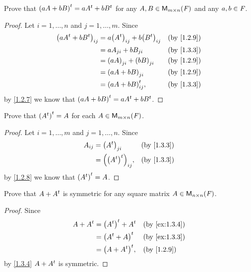 \exercisesection

\setcounter{ex}{2}
\begin{ex}\label{ex:1.3.3}
  Prove that \({\left\lparen aA + bB\right\rparen}^{t} = a{A}^{t} + b{B}^{t}\) for any \(A, B \in \mathsf{M}_{{m} \times n}({\mathit{F}})\) and any \(a, b \in \mathit{F}\).
\end{ex}

\begin{proof}
  Let \(i = 1, \dots, n\) and \(j = 1, \dots, m\).
  Since
  \begin{align*}
    \p{a\tp{A} + b\tp{B}}_{i j} & = a\p{\tp{A}}_{i j} + b\p{\tp{B}}_{i j} &  & \text{(by \cref{1.2.9})} \\
                                & = aA_{j i} + bB_{j i}                   &  & \text{(by \cref{1.3.3})} \\
                                & = \p{aA}_{j i} + \p{bB}_{j i}           &  & \text{(by \cref{1.2.9})} \\
                                & = \p{aA + bB}_{j i}                     &  & \text{(by \cref{1.2.9})} \\
                                & = \tp{\p{aA + bB}}_{i j},               &  & \text{(by \cref{1.3.3})}
  \end{align*}
  by \cref{1.2.7} we know that \({\left\lparen aA + bB\right\rparen}^{t} = a{A}^{t} + b{B}^{t}\).
\end{proof}

\begin{ex}\label{ex:1.3.4}
  Prove that \({\left\lparen{A}^{t}\right\rparen}^{t} = A\) for each \(A \in \mathsf{M}_{{m} \times n}({\mathit{F}})\).
\end{ex}

\begin{proof}
  Let \(i = 1, \dots, m\) and \(j = 1, \dots, n\).
  Since
  \begin{align*}
    A_{i j} & = \p{\tp{A}}_{j i}           &  & \text{(by \cref{1.3.3})} \\
            & = \p{\tp{\p{\tp{A}}}}_{i j}, &  & \text{(by \cref{1.3.3})}
  \end{align*}
  by \cref{1.2.8} we know that \({\left\lparen{A}^{t}\right\rparen}^{t} = A\).
\end{proof}

\begin{ex}\label{ex:1.3.5}
  Prove that \(A + {A}^{t}\) is symmetric for any square matrix \(A \in \mathsf{M}_{{n} \times n}({\mathit{F}})\).
\end{ex}

\begin{proof}
  Since
  \begin{align*}
    A + \tp{A} & = \tp{\p{\tp{A}}} + \tp{A} &  & \text{(by \cref{ex:1.3.4})} \\
               & = \tp{\p{\tp{A} + A}}      &  & \text{(by \cref{ex:1.3.3})} \\
               & = \tp{\p{A + \tp{A}}},     &  & \text{(by \cref{1.2.9})}
  \end{align*}
  by \cref{1.3.4} \(A + {A}^{t}\) is symmetric.
\end{proof}


